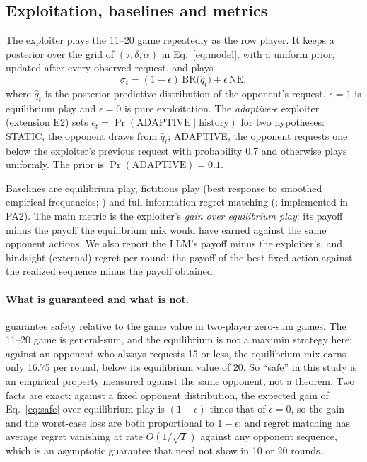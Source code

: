 \documentclass[11pt]{article}
\begin{document}
\subsection{Exploitation, baselines and metrics}
The exploiter plays the 11--20 game repeatedly as the row player. It keeps a posterior over the grid of $(\tau,\delta,\alpha)$ in Eq.~\eqref{eq:model}, with a uniform prior, updated after every observed request, and plays
\begin{equation}\label{eq:safe}
\sigma_t=(1-\epsilon)\,\mathrm{BR}\big(\hat q_t\big)+\epsilon\,\mathrm{NE},
\end{equation}
where $\hat q_t$ is the posterior predictive distribution of the opponent's request. $\epsilon=1$ is equilibrium play and $\epsilon=0$ is pure exploitation. The \emph{adaptive-$\epsilon$} exploiter (extension E2) sets $\epsilon_t=\Pr(\text{ADAPTIVE}\mid\text{history})$ for two hypotheses: STATIC, the opponent draws from $\hat q_t$; ADAPTIVE, the opponent requests one below the exploiter's previous request with probability 0.7 and otherwise plays uniformly. The prior is $\Pr(\text{ADAPTIVE})=0.1$.

Baselines are equilibrium play, fictitious play (best response to smoothed empirical frequencies; \citealp{brown1951}) and full-information regret matching (\citealp{hart2000}; implemented in PA2). The main metric is the exploiter's \emph{gain over equilibrium play}: its payoff minus the payoff the equilibrium mix would have earned against the same opponent actions. We also report the LLM's payoff minus the exploiter's, and hindsight (external) regret per round: the payoff of the best fixed action against the realized sequence minus the payoff obtained.

\paragraph{What is guaranteed and what is not.} \citet{ganzfried2015} guarantee safety relative to the game value in two-player zero-sum games. The 11--20 game is general-sum, and the equilibrium is not a maximin strategy here: against an opponent who always requests 15 or less, the equilibrium mix earns only 16.75 per round, below its equilibrium value of 20. So ``safe'' in this study is an empirical property measured against the same opponent, not a theorem. Two facts are exact: against a fixed opponent distribution, the expected gain of Eq.~\eqref{eq:safe} over equilibrium play is $(1-\epsilon)$ times that of $\epsilon=0$, so the gain and the worst-case loss are both proportional to $1-\epsilon$; and regret matching has average regret vanishing at rate $O(1/\sqrt{T})$ against any opponent sequence, which is an asymptotic guarantee that need not show in 10 or 20 rounds.
\end{document}
